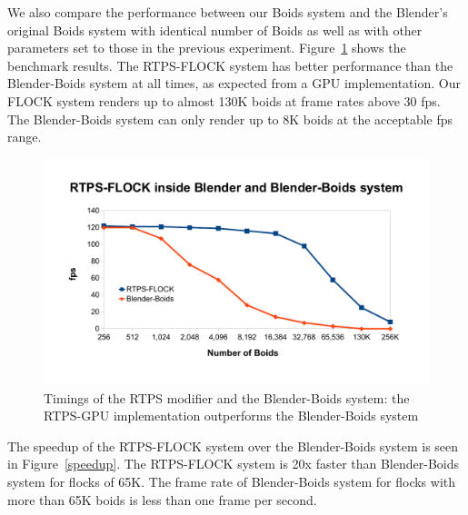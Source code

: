 We also compare the performance between our Boids system and the Blender's original Boids system with identical number of Boids as well as with other parameters set to those in the previous experiment. Figure~\ref{RTPSvsBlender} shows the benchmark results. The RTPS-FLOCK system has better performance than the Blender-Boids system at all times, as expected from a GPU implementation. Our FLOCK system renders up to almost 130K boids at frame rates above 30 fps. The Blender-Boids system can only render up to 8K boids at the acceptable fps range.

\begin{figure}[htbp]
\begin{center}
\includegraphics[scale=0.7]{figures/benchmarks.pdf}
\caption{Timings of the RTPS modifier and the Blender-Boids system: the RTPS-GPU implementation outperforms the Blender-Boids system}
\label{RTPSvsBlender}
\end{center}
\end{figure}

The speedup of the RTPS-FLOCK system over the Blender-Boids system is seen in Figure~\ref{speedup}. The RTPS-FLOCK system is 20x faster than Blender-Boids system for flocks of 65K. The frame rate of Blender-Boids system for flocks with more than 65K boids is less than one frame per second.

